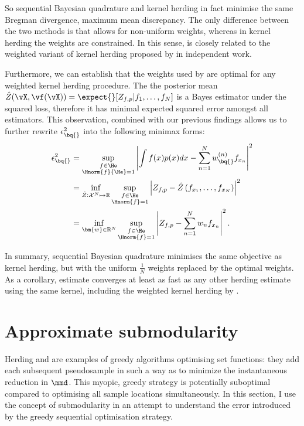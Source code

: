 So sequential Bayesian quadrature and kernel herding in fact minimise the same Bregman divergence, maximum mean discrepancy. The only difference between the two methods is that \sbq{} allows for non-uniform weights, whereas in kernel herding the weights are constrained. In this sense, \sbq{} is closely related to the weighted variant of kernel herding proposed by \citet{Bach2012} in independent work.

Furthermore, we can establish that the weights used by \sbq{} are optimal for any weighted kernel herding procedure. The the posterior mean $\hat{Z}(\vX,\vf(\vX)) = \expect{}[{Z_{f,p}\vert f_1,\ldots,f_N}]$ is a Bayes estimator under the squared loss, therefore it has minimal expected squared error amongst all estimators. This observation, combined with our previous findings allows us to further rewrite $\epsilon^{2}_{\bq{}}$ into the following minimax forms:
%
\begin{align}
\epsilon^{2}_{\bq{}} &= \sup_{\substack{f\in\He\\\Hnorm{f}{\He}=1}} \left| \int f(x) p(x) dx - \sum_{n=1}^{N}w^{(n)}_{\bq{}} f_{x_n}\right|^2\\
	&= \inf_{\hat{Z}:\mathcal{X}^N\mapsto\mathbb{R}} \sup_{\substack{f\in\He\\\Hnorm{f}=1}} \left| Z_{f,p} - \hat{Z}\left(f_{x_1},\ldots,f_{x_N}\right)\right|^2\\
	&= \inf_{\bm{w}\in\mathbb{R}^N} \sup_{\substack{f\in\He\\\Hnorm{f}=1}} \left| Z_{f,p} - \sum_{n=1}^{N}w_n  f_{x_n}\right|^2.
\end{align}

In summary, sequential Bayesian quadrature minimises the same objective as kernel herding, but with the uniform $\frac{1}{N}$ weights replaced by the optimal weights. As a corollary, \sbq{} estimate converges at least as fast as any other herding estimate using the same kernel, including the weighted kernel herding by \citet{Bach2012}.

\section{Approximate submodularity}

Herding and \sbq{} are examples of greedy algorithms optimising set functions: they add each subsequent pseudosample in such a way as to minimize the instantaneous reduction in $\mmd$. This myopic, greedy strategy is potentially suboptimal compared to optimising all sample locations simultaneously. In this section, I use the concept of submodularity \citep[see \eg][]{KrauseCevher10} in an attempt to understand the error introduced by the greedy sequential optimisation strategy.

